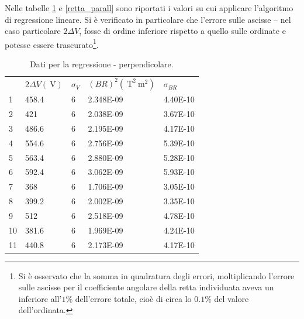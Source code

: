\documentclass[a4paper,11pt]{article}
\begin{document}
		Nelle tabelle \ref{retta_perp} e \ref{retta_parall} sono riportati i valori su cui applicare l'algoritmo di regressione lineare. Si è verificato in particolare che l'errore sulle ascisse -- nel caso particolare $2\Delta V$, fosse di ordine inferiore rispetto a quello sulle ordinate e potesse essere trascurato\footnote{Si è osservato che la somma in quadratura degli errori, moltiplicando l'errore sulle ascisse per il coefficiente angolare della retta individuata aveva un inferiore all'$1\%$ dell'errore totale, cioè di circa lo $0.1\%$ del valore dell'ordinata.}. 
		
		
		\begin{table}[]
			\centering
			\caption{Dati per la regressione - perpendicolare.}
			\label{retta_perp}
			\begin{tabular}{lllll}
				\rowcolor[HTML]{BBDAFF} 
				& $2\Delta V (\SI{}{\volt})$ & $\sigma_V$ & $(B R)^2 (\SI{}{\tesla}^2\SI{}{\meter}^2)$ & $\sigma_{BR}$  \\
				\rowcolor[HTML]{C0C0C0} 
				\cellcolor[HTML]{BBDAFF}1  & 458.4          & 6          & 2.348E-09                                                & 4.40E-10  \\
				\rowcolor[HTML]{EFEFEF} 
				\cellcolor[HTML]{BBDAFF}2  & 421            & 6          & 2.038E-09                                                & 3.67E-10  \\
				\rowcolor[HTML]{C0C0C0} 
				\cellcolor[HTML]{BBDAFF}3  & 486.6          & 6          & 2.195E-09                                                & 4.17E-10  \\
				\rowcolor[HTML]{EFEFEF} 
				\cellcolor[HTML]{BBDAFF}4  & 554.6          & 6          & 2.756E-09                                                & 5.39E-10  \\
				\rowcolor[HTML]{C0C0C0} 
				\cellcolor[HTML]{BBDAFF}5  & 563.4          & 6          & 2.880E-09                                                & 5.28E-10  \\
				\rowcolor[HTML]{EFEFEF} 
				\cellcolor[HTML]{BBDAFF}6  & 592.4          & 6          & 3.062E-09                                                & 5.93E-10  \\
				\rowcolor[HTML]{C0C0C0} 
				\cellcolor[HTML]{BBDAFF}7  & 368            & 6          & 1.706E-09                                                & 3.05E-10  \\
				\rowcolor[HTML]{EFEFEF} 
				\cellcolor[HTML]{BBDAFF}8  & 399.2          & 6          & 2.002E-09                                                & 3.35E-10  \\
				\rowcolor[HTML]{C0C0C0} 
				\cellcolor[HTML]{BBDAFF}9  & 512            & 6          & 2.518E-09                                                & 4.78E-10  \\
				\rowcolor[HTML]{EFEFEF} 
				\cellcolor[HTML]{BBDAFF}10 & 381.6          & 6          & 1.969E-09                                                & 4.24E-10  \\
				\rowcolor[HTML]{C0C0C0} 
				\cellcolor[HTML]{BBDAFF}11 & 440.8          & 6          & 2.173E-09                                                & 4.17E-10  
			\end{tabular}
		\end{table}
		
\end{document}
